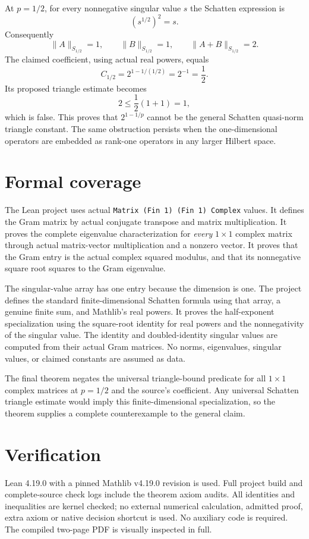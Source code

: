\documentclass[11pt,a4paper]{article}
\begin{document}
At $p=1/2$, for every nonnegative singular value $s$ the Schatten expression is
\[
 (s^{1/2})^2=s.
\]
Consequently
\[
 \|A\|_{S_{1/2}}=1,\qquad
 \|B\|_{S_{1/2}}=1,\qquad
 \|A+B\|_{S_{1/2}}=2.
\]
The claimed coefficient, using actual real powers, equals
\[
 C_{1/2}=2^{1-1/(1/2)}=2^{-1}=\frac12.
\]
Its proposed triangle estimate becomes
\[
 2\leq\frac12(1+1)=1,
\]
which is false. This proves that $2^{1-1/p}$ cannot be the general Schatten quasi-norm triangle constant. The same obstruction persists when the one-dimensional operators are embedded as rank-one operators in any larger Hilbert space.

\section*{Formal coverage}
The Lean project uses actual \texttt{Matrix (Fin 1) (Fin 1) Complex} values. It defines the Gram matrix by actual conjugate transpose and matrix multiplication. It proves the complete eigenvalue characterization for \emph{every} $1\times1$ complex matrix through actual matrix-vector multiplication and a nonzero vector. It proves that the Gram entry is the actual complex squared modulus, and that its nonnegative square root squares to the Gram eigenvalue.

The singular-value array has one entry because the dimension is one. The project defines the standard finite-dimensional Schatten formula using that array, a genuine finite sum, and Mathlib's real powers. It proves the half-exponent specialization using the square-root identity for real powers and the nonnegativity of the singular value. The identity and doubled-identity singular values are computed from their actual Gram matrices. No norms, eigenvalues, singular values, or claimed constants are assumed as data.

The final theorem negates the universal triangle-bound predicate for all $1\times1$ complex matrices at $p=1/2$ and the source's coefficient. Any universal Schatten triangle estimate would imply this finite-dimensional specialization, so the theorem supplies a complete counterexample to the general claim.

\section*{Verification}
Lean 4.19.0 with a pinned Mathlib v4.19.0 revision is used. Full project build and complete-source check logs include the theorem axiom audits. All identities and inequalities are kernel checked; no external numerical calculation, admitted proof, extra axiom or native decision shortcut is used. No auxiliary code is required. The compiled two-page PDF is visually inspected in full.
\end{document}
